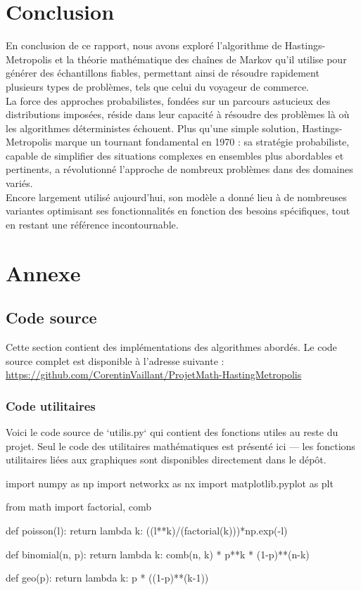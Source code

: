 \documentclass{article}
\begin{document}
\newpage %
\section{Conclusion}

En conclusion de ce rapport, nous avons exploré l'algorithme de Hastings-Metropolis et la théorie mathématique des chaînes de Markov qu'il utilise pour générer des échantillons fiables,
permettant ainsi de résoudre rapidement plusieurs types de problèmes, tels que celui du voyageur de commerce. \\

La force des approches probabilistes, fondées sur un parcours astucieux des distributions imposées, réside dans leur capacité à résoudre des problèmes là où les algorithmes déterministes échouent.
Plus qu'une simple solution, Hastings-Metropolis marque un tournant fondamental en 1970 : sa stratégie probabiliste, capable de simplifier des situations complexes en ensembles plus abordables et pertinents, a révolutionné l'approche de nombreux problèmes dans des domaines variés. \\

Encore largement utilisé aujourd'hui, son modèle a donné lieu à de nombreuses variantes optimisant ses fonctionnalités en fonction des besoins spécifiques, tout en restant une référence incontournable. \\

\newpage
\section{Annexe}

\subsection{Code source}

Cette section contient des implémentations des algorithmes abordés. Le code source complet est disponible à l'adresse suivante : \url{https://github.com/CorentinVaillant/ProjetMath-HastingMetropolis}

\subsubsection{Code utilitaires}

Voici le code source de `utilis.py` qui contient des fonctions utiles au reste du projet. Seul le code des utilitaires mathématiques est présenté ici — les fonctions utilitaires liées aux graphiques sont disponibles directement dans le dépôt.
\begin{python}
import numpy as np
import networkx as nx
import matplotlib.pyplot as plt

from math import factorial, comb

def poisson(l):
    return lambda k: ((l**k)/(factorial(k)))*np.exp(-l)

def binomial(n, p):
    return lambda k: comb(n, k) * p**k * (1-p)**(n-k)

def geo(p):
    return lambda k: p * ((1-p)**(k-1))
\end{python}
\newpage
\end{document}
